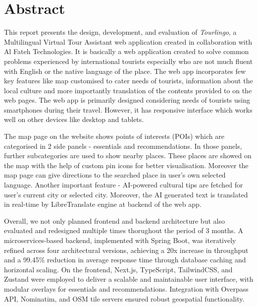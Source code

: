 \chapter*{\vspace{-3cm}Abstract}
\vspace{-0.5cm}   %

This report presents the design, development, and evaluation of \textit{Tourlingo}, a Multilingual Virtual Tour Assistant web application created in collaboration with Al Fateh Technologies. It is basically a web application created to solve common problems experienced by international tourists especially who are not much fluent with English or the native language of the place. The web app incorporates few key features like map customised to cater needs of tourists, information about the local culture and more importantly translation of the contents provided to on the web pages. The web app is primarily designed considering needs of tourists using smartphones during their travel. However, it has responsive interface which works well on other devices like desktop and tablets.

The map page on the website shows points of interests (POIs) which are categorised in 2 side panels - essentials and recommendations. In those panels, further subcategories are used to show nearby places. These places are showed on the map with the help of custom pin icons for better visualisation. Moreover the map page can give directions to the searched place in user's own selected language. Another important feature - AI-powered cultural tips are fetched for user's current city or selected city. Moreover, the AI generated text is translated in real-time by LibreTranslate engine at backend of the web app.

Overall, we not only planned frontend and backend architecture but also evaluated and redesigned multiple times thorughout the period of 3 months. A microservices-based backend, implemented with Spring Boot, was iteratively refined across four architectural versions, achieving a 20x increase in throughput and a 99.45\% reduction in average response time through database caching and horizontal scaling. On the frontend, Next.js, TypeScript, TailwindCSS, and Zustand were employed to deliver a scalable and maintainable user interface, with modular overlays for essentials and recommendations. Integration with Overpass API, Nominatim, and OSM tile servers ensured robust geospatial functionality.

